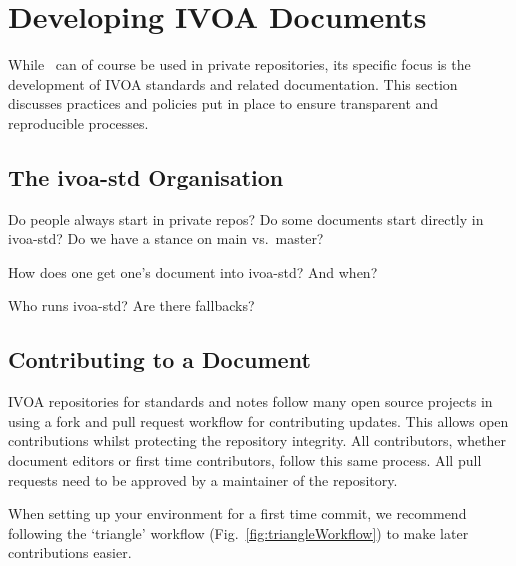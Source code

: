 \documentclass[11pt,a4paper]{ivoa}
\begin{document}
\section{Developing IVOA Documents}
\label{sect:ivoapol}

While \ivoatex\ can of course be used in private repositories, its
specific focus is the development of IVOA standards and related
documentation.  This section discusses practices and policies put in
place to ensure transparent and reproducible processes.

\subsection{The ivoa-std Organisation}

Do people always start in private repos?  Do some documents start
directly in ivoa-std?  Do we have a stance on main vs.~master?

How does one get one's document into ivoa-std?  And when?

Who runs ivoa-std?  Are there fallbacks?

\subsection{Contributing to a Document}
\label{sect:contributing}

IVOA repositories for standards and notes follow many open source 
projects in using a fork and pull request workflow for contributing 
updates. This allows open contributions whilst protecting the repository
integrity. All contributors, whether document editors or first time 
contributors, follow this same process. All pull requests need to be 
approved by a maintainer of the repository.

When setting up your environment for a first time commit, we recommend
following the `triangle' workflow (Fig.~\ref{fig:triangleWorkflow}) to
make later contributions easier. 
\end{document}
